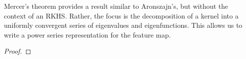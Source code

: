 Mercer's theorem provides a result similar to Aronszajn's, but without the context of an RKHS.
Rather, the focus is the decomposition of a kernel into a uniformly convergent series of eigenvalues and eigenfunctions.
This allows us to write a power series representation for the feature map.

\begin{theorem}
    \label{thm:mercers}
    \cite{mercer1909xvi}
    
\end{theorem}
\begin{proof}
    
\end{proof}